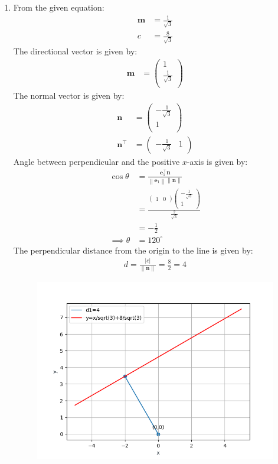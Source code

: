 \documentclass[12pt]{article}
\providecommand{\norm}[1]{\left\lVert#1\right\rVert}
\newcommand{\myvec}[1]{\ensuremath{\begin{pmatrix}#1\end{pmatrix}}}
\let\vec\mathbf
\begin{document}
\begin{enumerate}
\item From the given equation:
	\begin{align}
		\vec{m}&=\frac{1}{\sqrt{3}}\\
		c&=\frac{8}{\sqrt{3}}
	\end{align}
        The directional vector is given by:
	\begin{align}
		\vec{m}&=\myvec{1\\\frac{1}{\sqrt{3}}\\}
	\end{align}
	The normal vector is given by:
		\begin{align}
	\vec{n}&=\myvec{-\frac{1}{\sqrt{3}}\\1\\}\\
	\vec{n}^\top&=\myvec{-\frac{1}{\sqrt{3}} & 1}
			\end{align}
	Angle between perpendicular and the positive $x$-axis is given by:
		\begin{align}
		\cos\theta&=\frac{\vec{e}_{1}^\top\vec{n}}{\norm{\vec{e}_{1}}\norm{\vec{n}}}\\
			&=\frac{\myvec{1&0}\myvec{-\frac{1}{\sqrt{3}} \\ 1\\}}{\frac{2}{\sqrt{3}}}\\
			&=-\frac{1}{2}\\
			\implies	\theta&=120^\circ
		\end{align}
	The perpendicular distance from the origin to the line is given by:
		\begin{align}
			d=\frac{|c|}{\norm{\vec{n}}}=\frac{8}{2}=4
		\end{align}
\begin{figure}[H]
	\begin{center} 
	    \includegraphics[width=\columnwidth]{./figs/line1.png}

\end{center}
\end{figure}
\end{enumerate}
\end{document}
